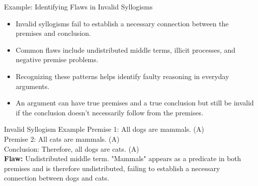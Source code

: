 \documentclass{beamer}
\begin{document}
	\begin{frame}{Example: Identifying Flaws in Invalid Syllogisms}
		\begin{itemize}
			\item Invalid syllogisms fail to establish a necessary connection between the premises and conclusion.
			\item Common flaws include undistributed middle terms, illicit processes, and negative premise problems.
			\item Recognizing these patterns helps identify faulty reasoning in everyday arguments.
			\item An argument can have true premises and a true conclusion but still be invalid if the conclusion doesn't necessarily follow from the premises.
		\end{itemize}
		
		\begin{alertblock}{Invalid Syllogism Example}
			Premise 1: All dogs are mammals. (A)\\
			Premise 2: All cats are mammals. (A)\\
			Conclusion: Therefore, all dogs are cats. (A)\\
			
			\textbf{Flaw:} Undistributed middle term. "Mammals" appears as a predicate in both premises and is therefore undistributed, failing to establish a necessary connection between dogs and cats.
		\end{alertblock}
	\end{frame}
	
\end{document}
